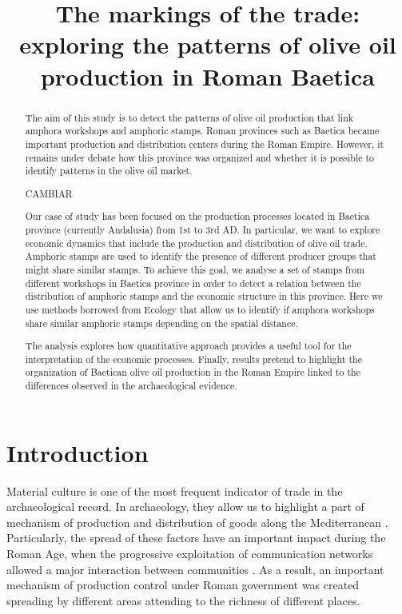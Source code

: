 \documentclass[review]{elsarticle}
\begin{document}
\title{The markings of the trade: exploring the patterns of olive oil production in Roman Baetica}


\begin{frontmatter}


\begin{abstract}

The aim of this study is to detect the patterns of olive oil production that link amphora workshops and amphoric stamps. Roman provinces such as Baetica became important production and distribution centers during the Roman Empire. However, it remains under debate how this province was organized and whether it is possible to identify patterns in the olive oil market. 

CAMBIAR

Our case of study has been focused on the production processes located in Baetica province (currently Andalusia) from 1st to 3rd AD. In particular, we want to explore economic dynamics that include the production and distribution of olive oil trade. Amphoric stamps are used to identify the presence of different producer groups that might share similar stamps. To achieve this goal, we analyse a set of stamps from different workshops in Baetica province in order to detect a relation between the distribution of amphoric stamps and the economic structure in this province. Here we use methods borrowed from Ecology that allow us to identify if amphora workshops share similar amphoric stamps depending on the spatial distance. 

The analysis explores how quantitative approach provides a useful tool for the interpretation of the economic processes. Finally, results pretend to highlight the organization of Baetican olive oil production in the Roman Empire linked to the differences observed in the archaeological evidence.

\end{abstract}


\end{frontmatter}

\section{Introduction}


Material culture is one of the most frequent indicator of trade in the archaeological record. In archaeology, they allow us to highlight a part of mechanism of production and distribution of goods along the Mediterranean \citep{bevan_mediterranean_2014}. Particularly, the spread of these factors have an important impact during the Roman Age, when the progressive exploitation of communication networks allowed a major interaction between communities \citep{orengo_seeds_2016}. As a result, an important mechanism of production control under Roman government was created spreading by different areas attending to the richness of different places. 
\end{document}
